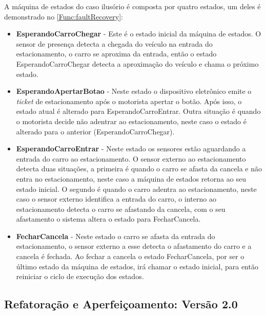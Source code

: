 A máquina de estados do caso ilusório é composta por quatro estados, um deles é demonstrado no \autoref{Func:faultRecovery}:

\begin{itemize}
	\item \textbf{EsperandoCarroChegar} - Este é o estado inicial da máquina de estados. O sensor de presença detecta a chegada do veículo na entrada do estacionamento, o carro se aproxima da entrada, então o estado EsperandoCarroChegar detecta a aproximação do veículo e chama o próximo estado.
	
	\item \textbf{EsperandoApertarBotao} - Neste estado o dispositivo eletrônico emite o \textit{ticket} de estacionamento após o motorista apertar o botão. Após isso, o estado atual é alterado para EsperandoCarroEntrar. Outra situação é quando o motorista decide não adentrar ao estacionamento, neste caso o estado é alterado para o anterior (EsperandoCarroChegar). 
	
	\item \textbf{EsperandoCarroEntrar} - Neste estado os sensores estão aguardando a entrada do carro ao estacionamento. O sensor externo ao estacionamento detecta duas situações, a primeira é quando o carro se afasta da cancela e não entra no estacionamento, neste caso a máquina de estados retorna ao seu estado inicial. O segundo é quando o carro adentra ao estacionamento, neste caso o sensor externo identifica a entrada do carro, o interno ao estacionamento detecta o carro se afastando da cancela, com o seu afastamento o sistema altera o estado para FecharCancela.
	
	\item \textbf{FecharCancela} - Neste estado o carro se afasta da entrada do estacionamento, o sensor externo a esse detecta o afastamento do carro e a cancela é fechada. Ao fechar a cancela o estado FecharCancela, por ser o último estado da máquina de estados, irá chamar o estado inicial, para então reiniciar o ciclo de execução dos estados.
	
\end{itemize}


\subsection{Refatoração e Aperfeiçoamento: Versão 2.0} \label{subsec:versao2}

